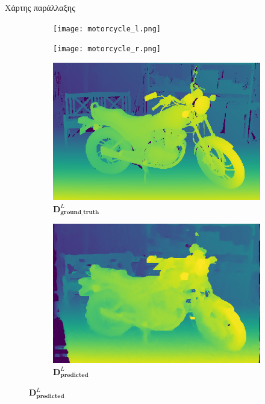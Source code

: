 \documentclass[english,greek]{beamer}
\begin{document}
\begin{frame}[t]{Χάρτης παράλλαξης}
	\begin{figure}
		\centering
		\begin{subfigure}{0.49\textwidth}
		\texttt{[image: motorcycle\_l.png]}
		\end{subfigure}
		\begin{subfigure}{0.49\textwidth}
		\texttt{[image: motorcycle\_r.png]}
		\end{subfigure}
	\end{figure}
\begin{figure}
	\centering
	\begin{subfigure}{0.49\textwidth}
		\includegraphics[width=\textwidth, height = 0.45\textwidth]{motorcycle_disp_map_visualization.png}
		\caption{$\mathbf{D}_{\mathbf{ground\_truth}}^L$}
		\label{fig:motorcycle_disp_map} 
	\end{subfigure}
	\begin{subfigure}{0.49\textwidth}
		\includegraphics[width=\textwidth, height = 0.45\textwidth]{motorcycle_prediction.png}
		\caption{$\mathbf{D}_{\mathbf{predicted}}^L$}
		\label{fig:motorcycle_pred_disp_map}
	\end{subfigure}
\end{figure}
\end{frame}
\end{document}
